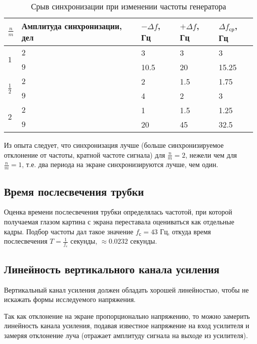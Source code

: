 \begin{table}[H]
	\centering
	\begin{tabu} to  
		\hline
		$\frac{n}{m}$ & Амплитуда синхронизации, дел& $-\Delta{f}$, Гц & $+\Delta{f}$, Гц & $\Delta{f_\text{ср}}$, Гц \\ 
		\hline
		& $2$ & 3 & 3 & 3\\
		\hhline{|~|-|-|-|-|}
		& $9$ & 10.5 & 20 & 15.25\\
		\hline
		& $2$ & 2 & 1.5 & 1.75\\
		\hhline{|~|-|-|-|-|}
		& $9$ & 4 & 2 & 3\\
		\hline
		& $2$ & 1 & 1.5 & 1.25\\
		\hhline{|~|-|-|-|-|}
		& $9$ & 20 & 45 & 32.5\\
		\hline
	\end{tabu}
	\label{tab:kappa-hor}
	\caption{Срыв синхронизации при изменении частоты генератора}
\end{table}

Из опыта следует, что синхронизация лучше (больше синхронизируемое отклонение от частоты, кратной частоте сигнала) для $\frac{n}{m}=2$, нежели чем для $\frac{n}{m}=1$, т.е. два периода на экране синхронизируются лучше, чем один.

\subsection{Время послесвечения трубки}

Оценка времени послесвечения трубки определялась частотой, при которой получаемая глазом картина с экрана  переставала оцениваться как отдельные кадры. Подбор частоты дал такое значение $f_\text{с}=43$ Гц, откуда время послесвечения $T=\frac{1}{f_\text{с}}$ секунды, $\approx0.0232$ секунды.


\newpage
\subsection{Линейность вертикального канала усиления}

Вертикальный канал усиления должен обладать хорошей линейностью, чтобы не искажать формы исследуемого напряжения. 

Так как отклонение на экране пропорционально напряжению, то можно замерить линейность канала усиления, подавая известное напряжение на вход усилителя и замеряя отклонение луча (отражает амплитуду сигнала на выходе из усилителя).

